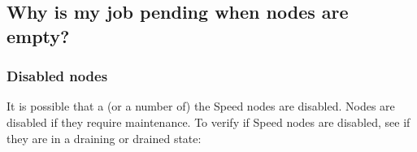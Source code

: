 \subsection{Why is my job pending when nodes are empty?}

\subsubsection{Disabled nodes}

It is possible that a (or a number of) the Speed nodes are disabled. Nodes are disabled if they require maintenance. 
To verify if Speed nodes are disabled, see if they are in a draining or drained state:


